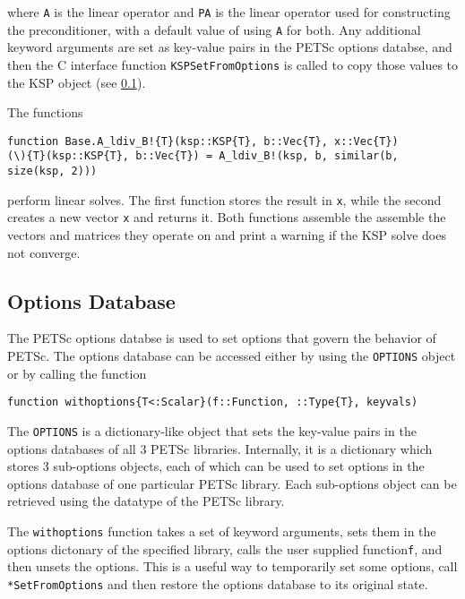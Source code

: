 \documentclass{article}
\newcommand{\ttt}{\texttt}
\begin{document}
where \ttt{A} is the linear operator and \ttt{PA}  is the linear operator used for constructing the preconditioner, with a default value of using \ttt{A} for both.
Any additional keyword arguments are set as key-value pairs in the PETSc options databse, and then the C interface function \ttt{KSPSetFromOptions} is called to copy those values to the KSP object (see \ref{sec:options}).

The functions
\begin{verbatim}
function Base.A_ldiv_B!{T}(ksp::KSP{T}, b::Vec{T}, x::Vec{T})
(\){T}(ksp::KSP{T}, b::Vec{T}) = A_ldiv_B!(ksp, b, similar(b, size(ksp, 2)))
\end{verbatim}
perform linear solves.
The first function stores the result in \ttt{x}, while the second creates a new vector \ttt{x} and returns it.
Both functions assemble the assemble the vectors and matrices they operate on and print a warning if the KSP solve does not converge.


\subsection{Options Database} \label{sec:options}
The PETSc options databse is used to set options that govern the behavior of PETSc.
The options database can be accessed either by using the \ttt{OPTIONS} object or by calling the function 

\begin{verbatim}
function withoptions{T<:Scalar}(f::Function, ::Type{T}, keyvals)
\end{verbatim}

The \ttt{OPTIONS} is a dictionary-like object that sets the key-value pairs in the options databases of all 3 PETSc libraries.
Internally, it is a dictionary which stores 3 sub-options objects, each of which can be used to set options in the options database of one particular PETSc library.
Each sub-options object can be retrieved using the datatype of the PETSc library.

The \ttt{withoptions} function takes a set of keyword arguments, sets them in the options dictonary of the specified library, calls the user supplied function\ttt{f}, and then unsets the options.
This is a useful way to temporarily set some options, call \ttt{*SetFromOptions} and then restore the options database to its original state.
\end{document}
